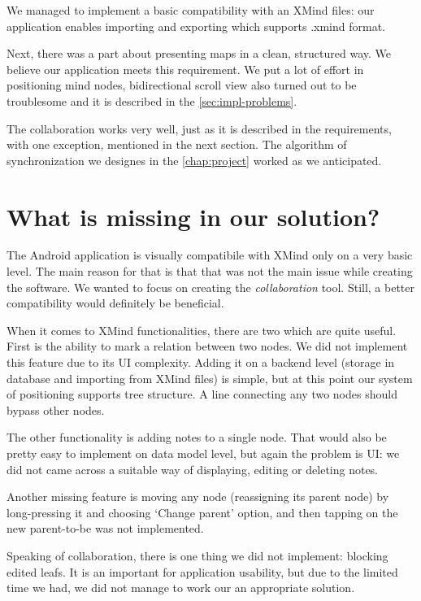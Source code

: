 We managed to implement a basic compatibility with an XMind files: our application enables importing and exporting which supports .xmind format. 

Next, there was a part about presenting maps in a clean, structured way. We believe our application meets this requirement. We put a lot of effort in positioning mind nodes, bidirectional scroll view also turned out to be troublesome and it is described in the \cref{sec:impl-problems}.

The collaboration works very well, just as it is described in the requirements, with one exception, mentioned in the next section. The algorithm of synchronization we designes in the \cref{chap:project} worked  as we anticipated. 

\section{What is missing in our solution?}
\label{sec:summary-missing}
The Android application is visually compatibile with XMind only on a very basic level. The main reason for that is that that was not the main issue while creating the software. We wanted to focus on creating the \emph{collaboration} tool. Still, a better compatibility would definitely be beneficial. 

When it comes to XMind functionalities, there are two which are quite useful. First is the ability to mark a relation between two nodes. We did not implement this feature due to its UI complexity. Adding it on a backend level (storage in database and importing from XMind files) is simple, but at this point our system of positioning supports tree structure. A line connecting any two nodes should  bypass other nodes. 

The other functionality is adding notes to a single node. That would also be pretty easy to implement on data model level, but again the problem is UI: we did not came across a suitable way of displaying, editing or deleting notes.
 
 Another missing feature is moving any node (reassigning its parent node) by long-pressing it and choosing `Change parent' option, and then tapping on the new parent-to-be was not implemented. 

Speaking of collaboration, there is one thing we did not implement: blocking edited leafs. It is an important for application usability, but due to the limited time we had, we did not manage to work our an appropriate solution. 


